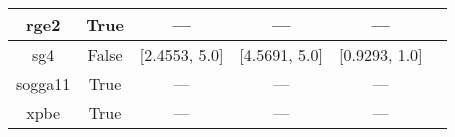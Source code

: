 \begin{tabular}{|c|c|c|c|c|l|}
    rge2 &                  True &              --- &           --- &            --- &                             \cite{Ruzsinszky2009_763} \\ \hline
     sg4 &                 False &    [2.4553, 5.0] & [4.5691, 5.0] &  [0.9293, 1.0] &                          \cite{Constantin2016_045126} \\ \hline
 sogga11 &                  True &              --- &           --- &            --- &                              \cite{Peverati2011_1991} \\ \hline
    xpbe &                  True &              --- &           --- &            --- &                                    \cite{Xu2004_4068} \\ \hline
\end{tabular}
